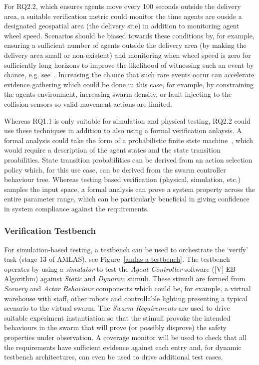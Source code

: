 \documentclass[lettersize,journal]{IEEEtran}
\begin{document}

For RQ2.2, which ensures agents move every 100 seconds outside the delivery area, a suitable verification metric could monitor the time agents are ouside a designated geospatial area (the delivery site) in addition to monitoring agent wheel speed. Scenarios should be biased towards these conditions by, for example, ensuring a sufficient number of agents outside the delivery area (by making the delivery area small or non-existent) and monitoring when wheel speed is zero for sufficiently long horizons to improve the likelihood of witnessing such an event by chance, e.g. see~\cite{chance2020agency}. Increasing the chance that such rare events occur can accelerate evidence gathering which could be done in this case, for example, by constraining the agents environment, increasing swarm density, or fault injecting to the collision sensors so valid movement actions are limited. 

Whereas RQ1.1 is only suitable for simulation and physical testing, RQ2.2 could use these techniques in addition to also using a formal verification anlaysis. A formal analysis could take the form of a probabilistic finite stste machine~\cite{Calinescu2018}, which would require a description of the agent states and the state transition proabilities. State transition probabilities can be derived from an action selection policy which, for this use case, can be derived from the swarm controller behaviour tree. Whereas testing based verification (physical, simulation, etc.) samples the input space, a formal analysis can prove a system property across the entire parameter range, which can be particularly beneficial in giving confidence in system compliance against the requirements. 


\subsubsection{Verification Testbench}

For simulation-based testing, a testbench can be used to orchestrate the `verify' task (stage 13 of AMLAS), see Figure~\ref{amlas-a-testbench}. The testbench operates by using a \emph{simulator} to test the \emph{Agent Controller} software ([V] EB Algorithm) against \emph{Static} and \emph{Dynamic} stimuli. These stimuli are formed from \emph{Scenery} and \emph{Actor Behaviour} components which could be, for example, a virtual warehouse with staff, other robots and controllable lighting presenting a typical scenario to the virtual swarm. The \emph{Swarm Requirements} are used to drive suitable experiment instantiation so that the stimuli provoke the intended behaviours in the swarm that will prove (or possibly disprove) the safety properties under observation. A coverage monitor will be used to check that all the requirements have sufficient evidence against each entry and, for dynamic testbench architectures, can even be used to drive additional test cases. 
\end{document}
